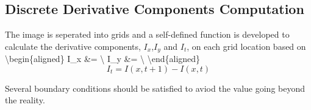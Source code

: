 \documentclass[11pt]{article}
\begin{document}
    \hypertarget{discrete-derivative-components-computation}{%
\subsection{Discrete Derivative Components
Computation}\label{discrete-derivative-components-computation}}

    The image is seperated into grids and a self-defined function is
developed to calculate the derivative components, \(I_x\),\(I_y\) and
\(I_t\), on each grid location based on \textbackslash{}begin\{aligned\}
I\_x \&=  \textbackslash{} I\_y \&=
 \textbackslash{}
\textbackslash{}end\{aligned\} \[I_t = I(x, t+1) - I(x, t)\]

Several boundary conditions should be satisfied to aviod the value going
beyond the reality.
\end{document}
